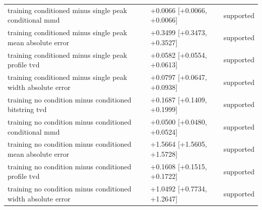 \begin{table}[p]
\begin{tabular}{@{}p{}p{}p{}@{}}
training conditioned minus single peak conditional mmd & +0.0066 [+0.0066, +0.0066] & supported \\
training conditioned minus single peak mean absolute error & +0.3499 [+0.3473, +0.3527] & supported \\
training conditioned minus single peak profile tvd & +0.0582 [+0.0554, +0.0613] & supported \\
training conditioned minus single peak width absolute error & +0.0797 [+0.0647, +0.0938] & supported \\
training no condition minus conditioned bitstring tvd & +0.1687 [+0.1409, +0.1999] & supported \\
training no condition minus conditioned conditional mmd & +0.0500 [+0.0480, +0.0524] & supported \\
training no condition minus conditioned mean absolute error & +1.5664 [+1.5605, +1.5728] & supported \\
training no condition minus conditioned profile tvd & +0.1608 [+0.1515, +0.1722] & supported \\
training no condition minus conditioned width absolute error & +1.0492 [+0.7734, +1.2647] & supported \\
\bottomrule
\end{tabular}
\end{table}
\clearpage
